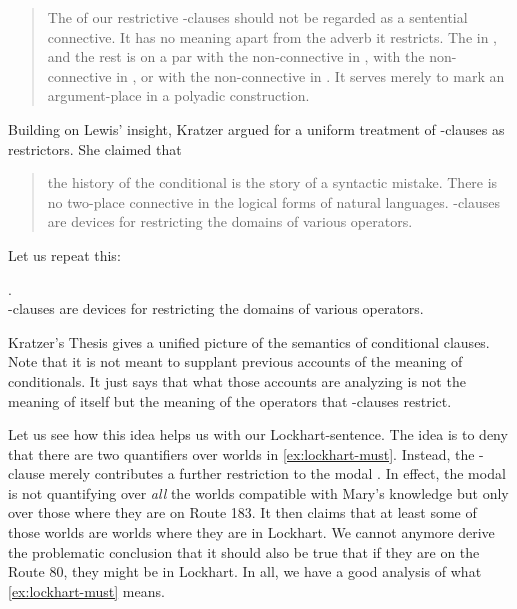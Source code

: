 \begin{quote}
	
	The  of our restrictive -clauses should not be regarded as a sentential connective. It has no meaning apart from the adverb it restricts. The  in , and the rest is on a par with the non-connective  in , with the non-connective  in , or with the non-connective  in . It serves merely to mark an argument-place in a polyadic construction. \cite[11]{lewis:1975:adverbs}

\end{quote}
%
Building on Lewis' insight, Kratzer argued for a uniform treatment of -clauses as restrictors. She claimed that 

\begin{quote}
	
	the history of the conditional is the story of a syntactic mistake. There is no two-place  connective in the logical forms of natural languages. -clauses are devices for restricting the domains of various operators. \citep{kratzer:1986:conditionals}
\end{quote}
%
Let us repeat this:

\ex. \\[3pt]
-clauses are devices for restricting the domains of various operators.

Kratzer's Thesis gives a unified picture of the semantics of conditional clauses. Note that it is not meant to supplant previous accounts of the meaning of conditionals. It just says that what those accounts are analyzing is not the meaning of  itself but the meaning of the operators that -clauses restrict. 

Let us see how this idea helps us with our Lockhart-sentence. The idea is to deny that there are two quantifiers over worlds in \ref{ex:lockhart-must}. Instead, the -clause merely contributes a further restriction to the modal . In effect, the modal is not quantifying over \emph{all} the worlds compatible with Mary's knowledge but only over those where they are on Route 183. It then claims that at least some of those worlds are worlds where they are in Lockhart. We cannot anymore derive the problematic conclusion that it should also be true that if they are on the Route 80, they might be in Lockhart. In all, we have a good analysis of what \ref{ex:lockhart-must} means.


